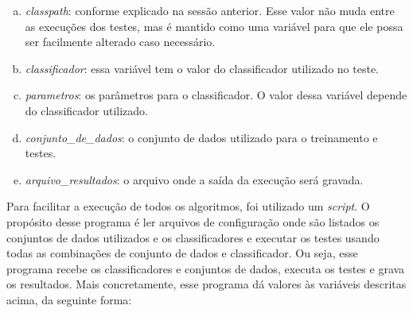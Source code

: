 \begin{enumerate}[a)]
    \item \emph{classpath}: conforme explicado na sessão anterior. Esse valor não muda entre as execuções dos testes, mas é mantido como uma variável para que ele possa ser facilmente alterado caso necessário.
    \item \emph{classificador}: essa variável tem o valor do classificador utilizado no teste.
    \item \emph{parametros}: os parâmetros para o classificador. O valor dessa variável depende do classificador utilizado.
    \item \emph{conjunto\_de\_dados}: o conjunto de dados utilizado para o treinamento e testes.
    \item \emph{arquivo\_resultados}: o arquivo onde a saída da execução será gravada.
\end{enumerate}

Para facilitar a execução de todos os algoritmos, foi utilizado um \emph{script}. O propósito desse programa é ler arquivos de configuração onde são listados os conjuntos de dados utilizados e os classificadores e executar os testes usando todas as combinações de conjunto de dados e classificador. Ou seja, esse programa recebe os classificadores e conjuntos de dados, executa os testes e grava os resultados. Mais concretamente, esse programa dá valores às variáveis descritas acima, da seguinte forma:

